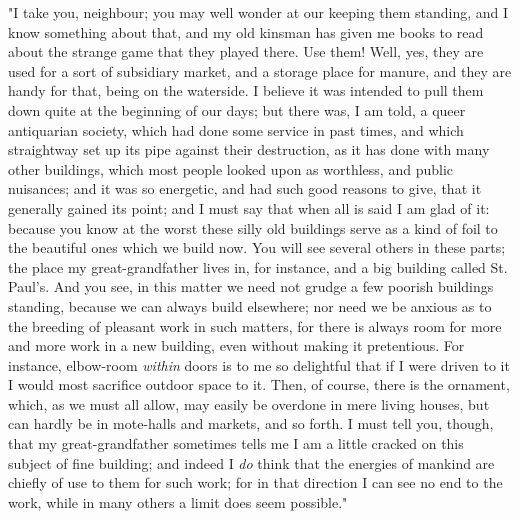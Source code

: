"I take you, neighbour; you may well wonder at our keeping them
standing, and I know something about that, and my old kinsman has given
me books to read about the strange game that they played there. Use
them! Well, yes, they are used for a sort of subsidiary market, and a
storage place for manure, and they are handy for that, being on the
waterside. I believe it was intended to pull them down quite at the
beginning of our days; but there was, I am told, a queer antiquarian
society, which had done some service in past times, and which
straightway set up its pipe against their destruction, as it has done
with many other buildings, which most people looked upon as worthless,
and public nuisances; and it was so energetic, and had such good reasons
to give, that it generally gained its point; and I must say that when
all is said I am glad of it: because you know at the worst these silly
old buildings serve as a kind of foil to the beautiful ones which we
build now. You will see several others in these parts; the place my
great-grandfather lives in, for instance, and a big building called St.
Paul's. And you see, in this matter we need not grudge a few poorish
buildings standing, because we can always build elsewhere; nor need we
be anxious as to the breeding of pleasant work in such matters, for
there is always room for more and more work in a new building, even
without making it pretentious. For instance, elbow-room \emph{within}
doors is to me so delightful that if I were driven to it I would most
sacrifice outdoor space to it. Then, of course, there is the ornament,
which, as we must all allow, may easily be overdone in mere living
houses, but can hardly be in mote-halls and markets, and so forth. I
must tell you, though, that my great-grandfather sometimes tells me I am
a little cracked on this subject of fine building; and indeed I
\emph{do} think that the energies of mankind are chiefly of use to them
for such work; for in that direction I can see no end to the work, while
in many others a limit does seem possible."
